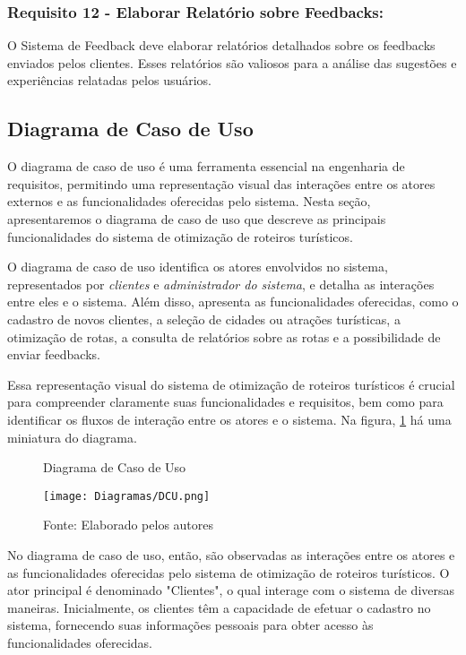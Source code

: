 \subsubsection{Requisito 12 - Elaborar Relatório sobre Feedbacks:} O Sistema de Feedback deve elaborar relatórios detalhados sobre os feedbacks enviados pelos clientes. Esses relatórios são valiosos para a análise das sugestões e experiências relatadas pelos usuários.

\subsection{Diagrama de Caso de Uso}

O diagrama de caso de uso é uma ferramenta essencial na engenharia de requisitos, permitindo uma representação visual das interações entre os atores externos e as funcionalidades oferecidas pelo sistema. Nesta seção, apresentaremos o diagrama de caso de uso que descreve as principais funcionalidades do sistema de otimização de roteiros turísticos.

O diagrama de caso de uso identifica os atores envolvidos no sistema, representados por \textit{clientes} e \textit{administrador do sistema}, e detalha as interações entre eles e o sistema. Além disso, apresenta as funcionalidades oferecidas, como o cadastro de novos clientes, a seleção de cidades ou atrações turísticas, a otimização de rotas, a consulta de relatórios sobre as rotas e a possibilidade de enviar feedbacks.

Essa representação visual do sistema de otimização de roteiros turísticos é crucial para compreender claramente suas funcionalidades e requisitos, bem como para identificar os fluxos de interação entre os atores e o sistema. Na figura, \ref{fig:DCU} há uma miniatura do diagrama.


\begin{figure}[H]
    \centering
    \caption{Diagrama de Caso de Uso}
    \label{fig:DCU}
    \texttt{[image: Diagramas/DCU.png]}\\
    \caption*{Fonte: Elaborado pelos autores}
\end{figure}

No diagrama de caso de uso, então, são observadas as interações entre os atores e as funcionalidades oferecidas pelo sistema de otimização de roteiros turísticos. O ator principal é denominado "Clientes", o qual interage com o sistema de diversas maneiras. Inicialmente, os clientes têm a capacidade de efetuar o cadastro no sistema, fornecendo suas informações pessoais para obter acesso às funcionalidades oferecidas.

